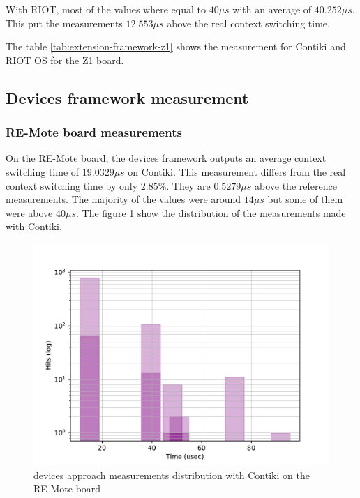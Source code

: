 With RIOT, most of the values where equal to $40 \mu s$ with an average of $40.252\mu s$.
This put the measurements $12.553\mu s$ above the real context switching time.

The table \ref{tab:extension-framework-z1} shows the measurement for Contiki and RIOT OS for the Z1 board.



\subsection{Devices framework measurement}

\subsubsection{RE-Mote board measurements}
On the RE-Mote board, the devices framework outputs an average context switching time of $19.0329\mu s$ on Contiki.
This measurement differs from the real context switching time by only $2.85\%$.
They are $0.5279\mu s$ above the reference measurements.
The majority of the values were around $14\mu s$ but some of them were above $40\mu s$.
The figure \ref{fig:devices-framework-contiki-remote} show the distribution of the measurements made with Contiki.

\begin{figure}[!ht]
      \centering
      \includegraphics[scale=.7]{assets/devices-framework-contiki-remote.pdf}
      \caption{devices approach measurements distribution with Contiki on the RE-Mote board\label{fig:devices-framework-contiki-remote}}
\end{figure}

